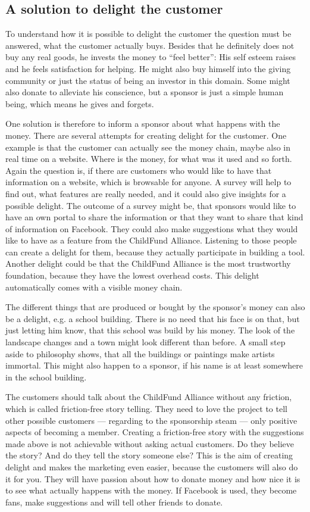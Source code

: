 \subsection{A solution to delight the customer}
To understand how it is possible to delight the customer the question must be answered, what the customer actually buys. Besides that he definitely does not buy any real goods, he invests the money to “feel better”: His self esteem raises and he feels satisfaction for helping. He might also buy himself into the giving community or just the status of being an investor in this domain. Some might also donate to alleviate his conscience, but a sponsor is just a simple human being, which means he gives and forgets.

One solution is therefore to inform a sponsor about what happens with the money. There are several attempts for creating delight for the customer. One example is that the customer can actually see the money chain, maybe also in real time on a website. Where is the money, for what was it used and so forth. Again the question is, if there are customers who would like to have that information on a website, which is browsable for anyone. A survey will help to find out, what features are really needed, and it could also give insights for a possible delight. The outcome of a survey might be, that sponsors would like to have an own portal to share the information or that they want to share that kind of information on Facebook. They could also make suggestions what they would like to have as a feature from the ChildFund Alliance. Listening to those people can create a delight for them, because they actually participate in building a tool. Another delight could be that the ChildFund Alliance is the most trustworthy foundation, because they have the lowest overhead costs. This delight automatically comes with a visible money chain. 

The different things that are produced or bought by the sponsor's money can also be a delight, e.g. a school building. There is no need that his face is on that, but just letting him know, that this school was build by his money. The look of the landscape changes and a town might look different than before. A small step aside to philosophy shows, that all the buildings or paintings make artists immortal. This might also happen to a sponsor, if his name is at least somewhere in the school building.

The customers should talk about the ChildFund Alliance without any friction, which is called friction-free story telling. They need to love the project to tell other possible customers — regarding to the sponsorship steam — only positive aspects of becoming a member. Creating a friction-free story with the suggestions made above is not achievable without asking actual customers. Do they believe the story? And do they tell the story someone else? This is the aim of creating delight and makes the marketing even easier, because the customers will also do it for you. They will have passion about how to donate money and how nice it is to see what actually happens with the money. If Facebook is used, they become fans, make suggestions and will tell other friends to donate.
